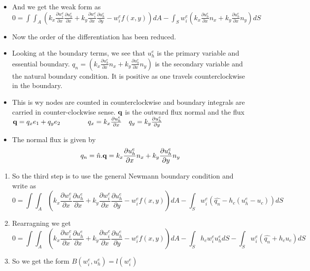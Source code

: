 	\begin{frame}
		\begin{itemize}
			\item And we get the weak form as \\
			$0 = \int\int_A   \left( k_x \frac{\partial w_i^e}{\partial x}\frac{\partial u_h^e}{\partial x} + k_y \frac{\partial w_i^e}{\partial x}\frac{\partial u_h^e}{\partial y} - w_i^ef(x,y) \right) dA - \int_S w_i^e \left( k_x \frac{\partial u_h^e}{\partial x}n_x + k_y \frac{\partial u_h^e}{\partial x}n_y \right) dS$
			\item Now the order of the differentiation has been reduced. 	
			\item Looking at the boundary terms, we see that $u_h^e$ is the primary variable and essential boundary. $q_n = \left( k_x \frac{\partial u_h^e}{\partial x}n_x + k_y \frac{\partial u_h^e}{\partial x}n_y \right)$ is the secondary variable and the natural boundary condition. It is positive as one travels counterclockwise in the boundary. 
			\item This is wy nodes are counted in counterclockwise and boundary integrals are carried in counter-clockwise sense. $\mathbf{q}$ is the outward flux normal and the flux $\mathbf{q} =q_x e_1 + q_ye_2 \qquad \qquad q_x= k_x \frac{\partial u_h^e}{\partial x}  \quad q_y = k_y\frac{\partial u_h^e}{\partial y}$
			\item  The normal flux is given by 
			\begin{equation}
			q_n = \hat{n}.\mathbf{q} =  k_x \frac{\partial u_h^e}{\partial x}n_x + k_y\frac{\partial u_h^e}{\partial y}n_y
			\end{equation}
		\end{itemize}
	\end{frame}



	\begin{frame}
		\begin{enumerate}
			\item So the third step is to use the general Newmann boundary condition and write as 
			\begin{equation}
			0 = \int\int_A   \left( k_x \frac{\partial w_i^e}{\partial x}\frac{\partial u_h^e}{\partial x} + k_y \frac{\partial w_i^e}{\partial x}\frac{\partial u_h^e}{\partial y} - w_i^ef(x,y) \right) dA - \int_S w_i^e \left( \hat{q_n} -h_c(u_h^e-u_c) \right) dS
			\end{equation}
			\item Rearragning we get 
			\begin{equation}
			0 = \int\int_A   \left( k_x \frac{\partial w_i^e}{\partial x}\frac{\partial u_h^e}{\partial x} + k_y \frac{\partial w_i^e}{\partial x}\frac{\partial u_h^e}{\partial y} - w_i^ef(x,y) \right) dA - \int_S h_cw_i^e u_h^e dS	- \int_S w_i^e \left( \hat{q_n} +h_cu_c \right) dS		
			\end{equation}
			\item So we get the form $B(w_i^e,u_h^e) = l(w_i^e)$
		\end{enumerate}
	\end{frame}


